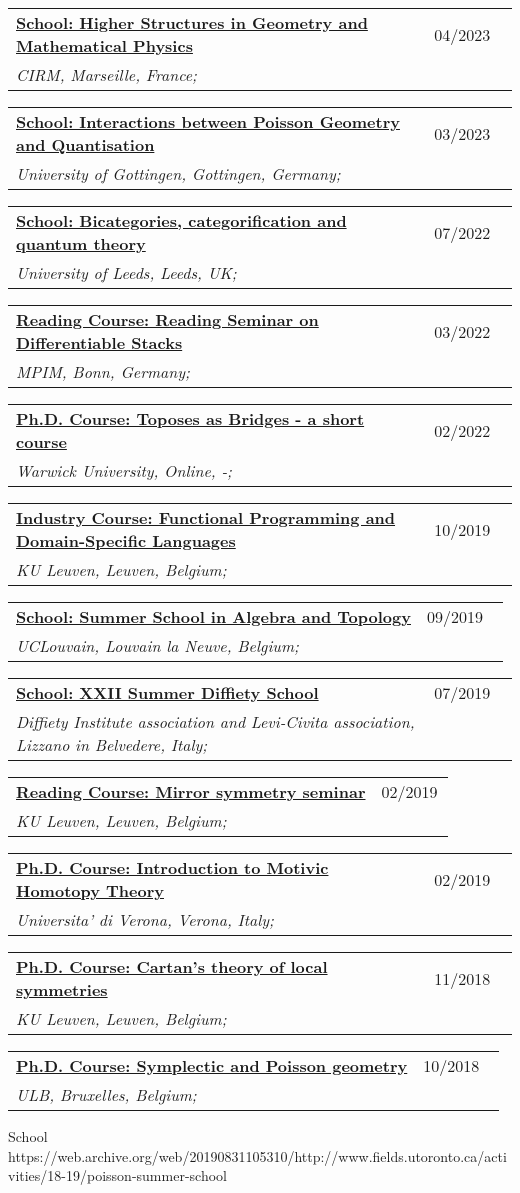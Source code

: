 \documentclass[a4paper]{article}
\newcommand{\longvoice}[8]{
	\begin{tabular}{p{0.83\linewidth} p{0.17\linewidth} }
		\textbf{\href{#3}{#2: #1}} & #4 
		\\ 
		\textit{#5, #6, #7;} & {\small\emph{#8}}
	\end{tabular}
	\vspace{.5em}
}
\begin{document}
	\longvoice{Higher Structures in Geometry and Mathematical Physics}
		{School}
		{https://conferences.cirm-math.fr/2697.html}
		{04/2023}
		{CIRM}
		{Marseille}
		{France}
		{}
	\longvoice{Interactions between Poisson Geometry and Quantisation}
		{School}
		{https://sites.google.com/view/poissonquantisation2023}
		{03/2023}
		{University of Gottingen}
		{Gottingen}
		{Germany}
		{}
	\longvoice{Bicategories, categorification and quantum theory}
		{School}
		{https://conferences.leeds.ac.uk/bcqt2022/}
		{07/2022}
		{University of Leeds}
		{Leeds}
		{UK}
		{}
	\longvoice{Reading Seminar on Differentiable Stacks}
		{Reading Course}
		{https://www.dropbox.com/s/a9tmw4g8m58ymkf/2203-Bonn-StackReadingSeminar.pdf?dl=0}
		{03/2022}
		{MPIM}
		{Bonn}
		{Germany}
		{}
	\longvoice{Toposes as Bridges - a short course}
		{Ph.D. Course}
		{https://warwick.ac.uk/fac/sci/maths/research/events/events2021-22/toposesasbridges/}
		{02/2022}
		{Warwick University}
		{Online}
		{-}
		{}
	\longvoice{Functional Programming and Domain-Specific Languages}
		{Industry Course}
		{https://dtai.cs.kuleuven.be/events/fpcourse/}
		{10/2019}
		{KU Leuven}
		{Leuven}
		{Belgium}
		{}
	\longvoice{Summer School in Algebra and Topology}
		{School}
		{https://web.archive.org/save/https://uclouvain.be/en/research-institutes/irmp/summer-school-in-algebra-and-topology-2019.html}
		{09/2019}
		{UCLouvain}
		{Louvain la Neuve}
		{Belgium}
		{}
	\longvoice{XXII Summer Diffiety School}
		{School}
		{https://sites.google.com/site/levicivitainstitute/Activities/DiffietySchools/xxii-summer-diffiety-school}
		{07/2019}
		{Diffiety Institute association and Levi-Civita association}
		{Lizzano in Belvedere}
		{Italy}
		{}
	\longvoice{Mirror symmetry seminar}
		{Reading Course}
		{https://wis.kuleuven.be/algebra/mirror-symmetry-seminar}
		{02/2019}
		{KU Leuven}
		{Leuven}
		{Belgium}
		{}
	\longvoice{Introduction to Motivic Homotopy Theory}
		{Ph.D. Course}
		{https://www.dropbox.com/s/fpqd1xsz4g8ecu4/1902-Verona-MotivicHomotopy.pdf?dl=0}
		{02/2019}
		{Universita' di Verona}
		{Verona}
		{Italy}
		{}
	\longvoice{Cartan's theory of local symmetries}
		{Ph.D. Course}
		{https://wis.kuleuven.be/methusalem-pure-math/methusalem-lecture-series/methusalem-lecture-series}
		{11/2018}
		{KU Leuven}
		{Leuven}
		{Belgium}
		{}
	\longvoice{Symplectic and Poisson geometry}
		{Ph.D. Course}
		{https://web.archive.org/web/20190831102514/http://homepages.ulb.ac.be/~rklaasse/symplecticpoissongeometry.html}
		{10/2018}
		{ULB}
		{Bruxelles}
		{Belgium}
		{}
		{School}
		{https://web.archive.org/web/20190831105310/http://www.fields.utoronto.ca/activities/18-19/poisson-summer-school}
\end{document}
